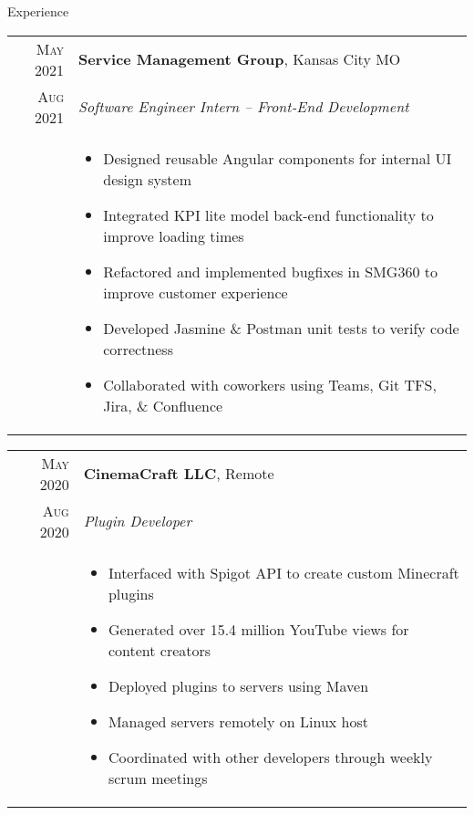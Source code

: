 \documentclass{resume}
\begin{document}
\begin{rSection}{Experience}
\small
{
  \begin{tabular}{r|p{15cm}}
    \textsc{May 2021} & \textbf{Service Management Group}, Kansas City MO \\
    \textsc{Aug 2021}  & \textit{Software Engineer Intern – Front-End Development} \\ &
    \begin{itemize}
      \item {Designed reusable Angular components for internal UI design system }
      \item {Integrated KPI lite model back-end functionality to improve loading times}
      \item {Refactored and implemented bugfixes in SMG360 to improve customer experience}
      \item {Developed Jasmine \& Postman unit tests to verify code correctness}
      \item {Collaborated with coworkers using Teams, Git TFS, Jira, \& Confluence}
    \end{itemize}
  \end{tabular}
  
  \begin{tabular}{r|p{15cm}}
    \textsc{May 2020} & \textbf{CinemaCraft LLC}, Remote \\
    \textsc{Aug 2020}  & \textit{Plugin Developer} \\ &
    \begin{itemize}
      \item {Interfaced with Spigot API to create custom Minecraft plugins}
      \item {Generated over 15.4 million YouTube views for content creators}
      \item {Deployed plugins to servers using Maven}
      \item {Managed servers remotely on Linux host}
      \item {Coordinated with other developers through weekly scrum meetings}
    \end{itemize}
  \end{tabular}

}
\end{rSection}
\end{document}
